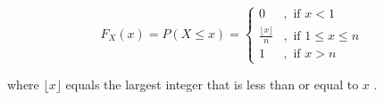 \[ F_X(x) = P(X \le x) = \begin{cases}
        0 &, \text{ if } x < 1\\
        \frac{\lfloor x \rfloor}{n} &, \text{ if } 1 \le x \le n\\
        1 &, \text{ if } x > n
    \end{cases}
\]

where $\lfloor x \rfloor$ equals the largest integer that is less than or equal to $x$ .